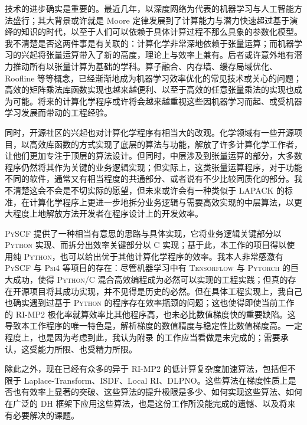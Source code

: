 技术的进步确实是重要的。最近几年，以深度网络为代表的机器学习与人工智能方法盛行；其大背景或许就是 Moore 定律发展到了计算能力与潜力快速超过基于演绎的知识的时代，以至于人们可以依赖于具体计算过程不那么具象的参数化模型。我不清楚是否这两件事是有关联的：计算化学非常深地依赖于张量运算；而机器学习的兴起将张量运算带入了新的高度，理论上与效率上兼有。后者或许意外地有潜力推动所有以张量计算为基础的学科。算子融合、内存墙、缓存局域优化、Roofline 等等概念，已经渐渐地成为机器学习效率优化的常见技术或关心的问题；高效的矩阵乘法库函数实现也越来越便利\cite{vanZee-vandeGeijn.ATMS.2015}、以至于高效的任意张量乘法的实现也成为可能\cite{Matthews-Matthews.SJSC.2018}。将来的计算化学程序或许将会越来越重视这些因机器学习而起、或受机器学习发展而带动的工程经验。

同时，开源社区的兴起也对计算化学程序有相当大的改观。化学领域有一些开源项目，以高效库函数的方式实现了底层的算法与功能\cite{Valeyev.libint, Lehtola-Marques.S.2018, Sun-Sun.JCC.2015}，解放了许多计算化学工作者，让他们更加专注于顶层的算法设计。但同时，中层涉及到张量运算的部分，大多数程序仍然将其作为关键的业务逻辑实现；但实际上，这类张量运算程序，对于功能不同的软件，通常又有相当程度的共通部分、或者说有不少比较同质化的部分。我不清楚这会不会是不切实际的愿望，但未来或许会有一种类似于 LAPACK 的标准，在计算化学程序上更进一步地拆分业务逻辑与需要高效实现的中层算法，以更大程度上地解放方法开发者在程序设计上的开发效率。

\textsc{PySCF} 提供了一种相当有意思的思路与具体实现，它将业务逻辑关键部分以 \textsc{Python} 实现、而拆分出效率关键部分以 C 实现\cite{Sun-Chan.WCMS.2018, Sun-Chan.JCP.2020}；基于此，本工作的项目得以使用纯 \textsc{Python}，也可以给出优于其他计算化学程序的效率。我本人非常感激有 \textsc{PySCF} 与 \textsc{Psi4} 等项目的存在：尽管机器学习中有 \textsc{Tensorflow} 与 \textsc{Pytorch} 的巨大成功，使得 \textsc{Python/C} 混合高效编程成为必然可以实现的工程实践；但真的存在开源项目将其成功实现，并不见得是历史的必然。但在具体工程实现上，我自己也确实遇到过基于 \textsc{Python} 的程序存在效率瓶颈的问题；这也使得即使当前工作的 RI-MP2 极化率就算效率比其他程序高，也未必比数值梯度快的重要缺陷。这导致本工作程序的唯一特色是，解析梯度的数值精度与稳定性比数值梯度高。一定程度上，也是因为考虑到此，我认为附录  的工作应当看做是未完成的；需要承认，这受能力所限、也受精力所限。

除此之外，现在已经有众多的异于 RI-MP2 的低计算复杂度加速算法，包括但不限于 Laplace-Transform\cite{Almloef-Almloef.CPL.1991}、ISDF\cite{Dong-Lin.JCTC.2018, Qin-Yang.JPCA.2020}、Local RI\cite{Ihrig-Blum.NJP.2015}、DLPNO\cite{Riplinger-Neese.JCP.2013, Pinski-Neese.JCP.2015}。这些算法在梯度性质上是否也有效率上显著的突破、这些算法的提升极限是多少、如何实现这些算法、如何在广泛的 DH 框架下应用这些算法，也是这份工作所没能完成的遗憾、以及将来有必要解决的课题。
